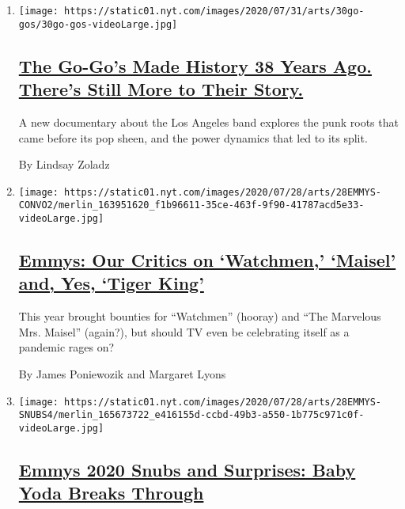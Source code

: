 \begin{enumerate}
\def\labelenumi{\arabic{enumi}.}
\item
  \texttt{[image: https://static01.nyt.com/images/2020/07/31/arts/30go-gos/30go-gos-videoLarge.jpg]}

  \hypertarget{the-go-gos-made-history-38-years-ago-theres-still-more-to-their-story}{%
  \subsection{\texorpdfstring{\href{/2020/07/29/arts/music/the-go-gos-documentary.html}{The
  Go-Go's Made History 38 Years Ago. There's Still More to Their
  Story.}}{The Go-Go's Made History 38 Years Ago. There's Still More to Their Story.}}\label{the-go-gos-made-history-38-years-ago-theres-still-more-to-their-story}}

  A new documentary about the Los Angeles band explores the punk roots
  that came before its pop sheen, and the power dynamics that led to its
  split.

  By Lindsay Zoladz
\item
  \texttt{[image: https://static01.nyt.com/images/2020/07/28/arts/28EMMYS-CONVO2/merlin\_163951620\_f1b96611-35ce-463f-9f90-41787acd5e33-videoLarge.jpg]}

  \hypertarget{emmys-our-critics-on-watchmen-maisel-and-yes-tiger-king}{%
  \subsection{\texorpdfstring{\href{/2020/07/28/arts/television/emmys-watchmen-handmaids-tale-tiger-king.html}{Emmys:
  Our Critics on `Watchmen,' `Maisel' and, Yes, `Tiger
  King'}}{Emmys: Our Critics on `Watchmen,' `Maisel' and, Yes, `Tiger King'}}\label{emmys-our-critics-on-watchmen-maisel-and-yes-tiger-king}}

  This year brought bounties for ``Watchmen'' (hooray) and ``The
  Marvelous Mrs. Maisel'' (again?), but should TV even be celebrating
  itself as a pandemic rages on?

  By James Poniewozik and Margaret Lyons
\item
  \texttt{[image: https://static01.nyt.com/images/2020/07/28/arts/28EMMYS-SNUBS4/merlin\_165673722\_e416155d-ccbd-49b3-a550-1b775c971c0f-videoLarge.jpg]}

  \hypertarget{emmys-2020-snubs-and-surprises-baby-yoda-breaks-through}{%
  \subsection{\texorpdfstring{\href{/2020/07/28/arts/television/emmys-snubs-mandalorian-zendaya-reese.html}{Emmys
  2020 Snubs and Surprises: Baby Yoda Breaks
  Through}}{Emmys 2020 Snubs and Surprises: Baby Yoda Breaks Through}}\label{emmys-2020-snubs-and-surprises-baby-yoda-breaks-through}}


\end{enumerate}
